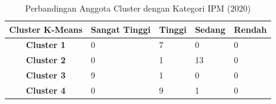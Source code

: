 \begin{table}[H]
\centering
\caption{Perbandingan Anggota Cluster dengan Kategori IPM (2020)} \label{tab:ipm_cross_2020}
\begin{tabular}{|c|p{2cm}|p{2cm}|p{2cm}|p{2cm}|}
\hline
\textbf{Cluster K-Means} & \textbf{Sangat Tinggi} & \textbf{Tinggi} & \textbf{Sedang} & \textbf{Rendah} \\ \hline
\textbf{Cluster 1} & 0 & 7 & 0 & 0 \\ \hline
\textbf{Cluster 2} & 0 & 1 & 13 & 0 \\ \hline
\textbf{Cluster 3} & 9 & 1 & 0 & 0 \\ \hline
\textbf{Cluster 4} & 0 & 9 & 1 & 0 \\ \hline
\end{tabular}
\end{table}